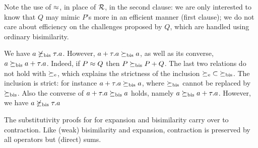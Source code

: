 Note the use of $\approx$, in place of ${\cal R}$, in the second clause:
we are only interested to know that $Q$ may  mimic $P$'s
more in an efficient manner (first clause); we do not care about
efficiency on the challenges proposed by $Q$, which are handled using ordinary
bisimilarity.

\begin{example}
\label{exa:contr}
We have %
 $ a \not  \mathrel{\succeq_{\rm{bis}}} \tau. a$. However,
$a+ \tau . a \mathrel{\succeq_{\rm{bis}}} a$, as well as its converse, 
$  a \mathrel{\succeq_{\rm{bis}}} a +
\tau . a $. Indeed, if $P \approx Q$ then 
$  P  \mathrel{\succeq_{\rm{bis}}} P +Q$. The last two relations do not hold with 
$\mathrel{\succeq_{\rm{e}}}$, which explains the strictness of the inclusion
 ${\mathrel{\succeq_{\rm{e}}}} \subset {\mathrel{\succeq_{\rm{bis}}}}$. 
The inclusion is strict: for instance
$a+ \tau . a \mathrel{\succeq_{\rm{bis}}} a$, where $\mathrel{\succeq_{\rm{bis}}}$ cannot be replaced by
$\mathrel{\succeq_{\rm{bis}}}$. Also the converse of  $a+ \tau . a \mathrel{\succeq_{\rm{bis}}} a$ holds, namely
$  a \mathrel{\succeq_{\rm{bis}}} a +
\tau . a $. However, we have %
$ a \not  \mathrel{\succeq_{\rm{bis}}} \tau. a$
\end{example} 

The substitutivity proofs for for expansion and bisimilarity carry
over to contraction. Like (weak) bisimilarity and expansion, contraction is
preserved by all operators but (direct) sums.

